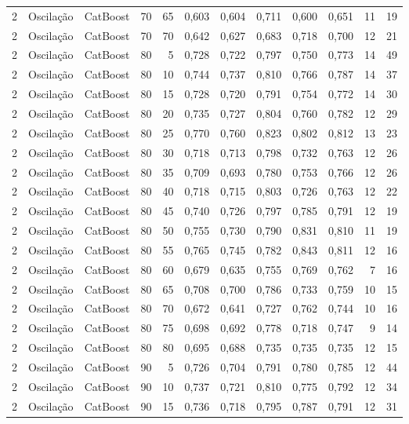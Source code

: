 \begin{longtable}{@{}rllrrrrrrrrr@{}}
2 & Oscilação & CatBoost & 70 & 65 & 0,603 & 0,604 & 0,711 & 0,600 & 0,651 & 11 & 19 \\
2 & Oscilação & CatBoost & 70 & 70 & 0,642 & 0,627 & 0,683 & 0,718 & 0,700 & 12 & 21 \\
2 & Oscilação & CatBoost & 80 & 5 & 0,728 & 0,722 & 0,797 & 0,750 & 0,773 & 14 & 49 \\
2 & Oscilação & CatBoost & 80 & 10 & 0,744 & 0,737 & 0,810 & 0,766 & 0,787 & 14 & 37 \\
2 & Oscilação & CatBoost & 80 & 15 & 0,728 & 0,720 & 0,791 & 0,754 & 0,772 & 14 & 30 \\
2 & Oscilação & CatBoost & 80 & 20 & 0,735 & 0,727 & 0,804 & 0,760 & 0,782 & 12 & 29 \\
2 & Oscilação & CatBoost & 80 & 25 & 0,770 & 0,760 & 0,823 & 0,802 & 0,812 & 13 & 23 \\
2 & Oscilação & CatBoost & 80 & 30 & 0,718 & 0,713 & 0,798 & 0,732 & 0,763 & 12 & 26 \\
2 & Oscilação & CatBoost & 80 & 35 & 0,709 & 0,693 & 0,780 & 0,753 & 0,766 & 12 & 26 \\
2 & Oscilação & CatBoost & 80 & 40 & 0,718 & 0,715 & 0,803 & 0,726 & 0,763 & 12 & 22 \\
2 & Oscilação & CatBoost & 80 & 45 & 0,740 & 0,726 & 0,797 & 0,785 & 0,791 & 12 & 19 \\
2 & Oscilação & CatBoost & 80 & 50 & 0,755 & 0,730 & 0,790 & 0,831 & 0,810 & 11 & 19 \\
2 & Oscilação & CatBoost & 80 & 55 & 0,765 & 0,745 & 0,782 & 0,843 & 0,811 & 12 & 16 \\
2 & Oscilação & CatBoost & 80 & 60 & 0,679 & 0,635 & 0,755 & 0,769 & 0,762 & 7 & 16 \\
2 & Oscilação & CatBoost & 80 & 65 & 0,708 & 0,700 & 0,786 & 0,733 & 0,759 & 10 & 15 \\
2 & Oscilação & CatBoost & 80 & 70 & 0,672 & 0,641 & 0,727 & 0,762 & 0,744 & 10 & 16 \\
2 & Oscilação & CatBoost & 80 & 75 & 0,698 & 0,692 & 0,778 & 0,718 & 0,747 & 9 & 14 \\
2 & Oscilação & CatBoost & 80 & 80 & 0,695 & 0,688 & 0,735 & 0,735 & 0,735 & 12 & 15 \\
2 & Oscilação & CatBoost & 90 & 5 & 0,726 & 0,704 & 0,791 & 0,780 & 0,785 & 12 & 44 \\
2 & Oscilação & CatBoost & 90 & 10 & 0,737 & 0,721 & 0,810 & 0,775 & 0,792 & 12 & 34 \\
2 & Oscilação & CatBoost & 90 & 15 & 0,736 & 0,718 & 0,795 & 0,787 & 0,791 & 12 & 31 \\

\end{longtable}
